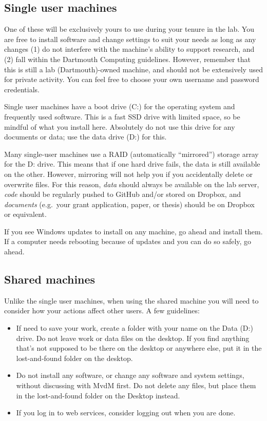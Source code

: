 \documentclass{tufte-book}
\begin{document}
\subsection{Single user machines}

One of these will be exclusively yours to use during your tenure in
the lab. You are free to install software and change settings to suit
your needs as long as any changes (1) do not interfere with the
machine's ability to support research, and (2) fall within the
Dartmouth Computing guidelines. However, remember that
this is still a lab (Dartmouth)-owned machine, and should not be
extensively used for private activity. You can feel free to choose
your own username and password credentials.

Single user machines have a boot drive (C:) for the operating system
and frequently used software. This is a fast SSD drive with limited
space, so be mindful of what you install here. Absolutely do not use
this drive for any documents or data; use the data drive (D:) for this.

Many single-user machines use a RAID (automatically ``mirrored'')
storage array for the D: drive.  This means that if one hard drive
fails, the data is still available on the other.  However, mirroring
will not help you if you accidentally delete or overwrite files. For
this reason, {\it data} should always be available on the lab server,
{\it code} should be regularly pushed to GitHub and/or stored on
Dropbox, and {\it
  documents} (e.g.\ your grant application, paper, or thesis) should
be on Dropbox or equivalent.

If you see Windows updates to install on any machine, go ahead and
install them. If a computer needs rebooting because of updates and you
can do so safely, go ahead.

\subsection{Shared machines}

Unlike the single user machines, when using the shared machine you
will need to consider how your actions affect other users. A few
guidelines:

\begin{itemize}
\item{If need to save your work, create a folder with your name on the
  Data (D:) drive. Do not leave work or data files on the desktop. If
  you find anything that's not supposed to be there on the desktop or
  anywhere else, put it in the lost-and-found folder on the desktop.}
\item{Do not install any software, or change any software and system
  settings, without discussing with MvdM first. Do not delete any
  files, but place them in the lost-and-found folder on the Desktop
  instead.}
\item{If you log in to web services, consider logging out when you
  are done.}
\end{itemize}
\end{document}
